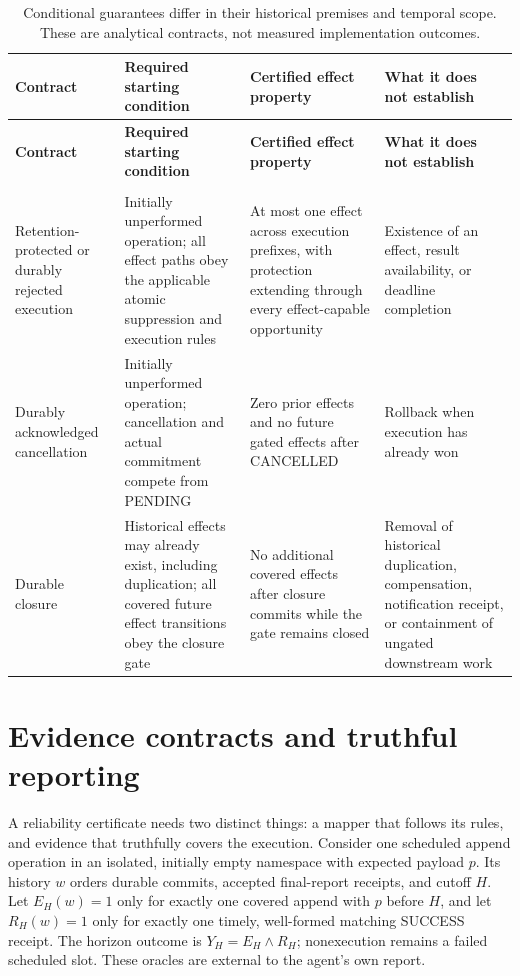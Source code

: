 \documentclass[11pt]{article}
\begin{document}
\begin{longtable}{@{}>{\raggedright\arraybackslash}p{}>{\raggedright\arraybackslash}p{}>{\raggedright\arraybackslash}p{}>{\raggedright\arraybackslash}p{}@{}}
\caption{Conditional guarantees differ in their historical premises and temporal scope. These are analytical contracts, not measured implementation outcomes.}\\
\toprule
\textbf{Contract} & \textbf{Required starting condition} & \textbf{Certified effect property} & \textbf{What it does not establish}\\
\midrule
\endfirsthead
\toprule
\textbf{Contract} & \textbf{Required starting condition} & \textbf{Certified effect property} & \textbf{What it does not establish}\\
\midrule
\endhead
\midrule
\multicolumn{4}{r}{\footnotesize Continued on next page}\\
\endfoot
\bottomrule
\endlastfoot
Retention-protected or durably rejected execution & Initially unperformed operation; all effect paths obey the applicable atomic suppression and execution rules & At most one effect across execution prefixes, with protection extending through every effect-capable opportunity & Existence of an effect, result availability, or deadline completion\\
Durably acknowledged cancellation & Initially unperformed operation; cancellation and actual commitment compete from PENDING & Zero prior effects and no future gated effects after CANCELLED & Rollback when execution has already won\\
Durable closure & Historical effects may already exist, including duplication; all covered future effect transitions obey the closure gate & No additional covered effects after closure commits while the gate remains closed & Removal of historical duplication, compensation, notification receipt, or containment of ungated downstream work\\
\end{longtable}
\par{}
\section{Evidence contracts and truthful reporting}
A reliability certificate needs two distinct things: a mapper that follows its rules, and evidence that truthfully covers the execution. Consider one scheduled append operation in an isolated, initially empty namespace with expected payload $p$. Its history $w$ orders durable commits, accepted final-report receipts, and cutoff $H$. Let $E_H(w)=1$ only for exactly one covered append with $p$ before $H$, and let $R_H(w)=1$ only for exactly one timely, well-formed matching SUCCESS receipt. The horizon outcome is $Y_H=E_H\land R_H$; nonexecution remains a failed scheduled slot. These oracles are external to the agent's own report.
\end{document}
